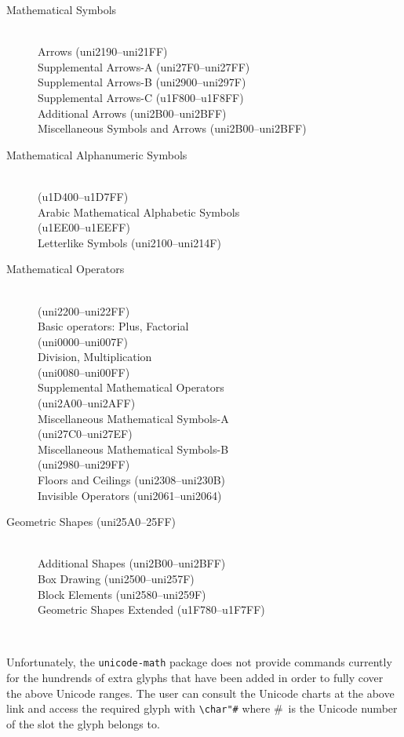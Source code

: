 \documentclass{article}
\begin{document}
\hspace*{-5em} \begin{description}
\item[Mathematical Symbols]
\ \\
Arrows (uni2190--uni21FF)\\
Supplemental Arrows-A (uni27F0--uni27FF)\\
Supplemental Arrows-B (uni2900--uni297F)\\
Supplemental Arrows-C (u1F800--u1F8FF)\\
Additional Arrows (uni2B00--uni2BFF)\\
Miscellaneous Symbols and Arrows (uni2B00--uni2BFF)
\item[Mathematical Alphanumeric Symbols] 
\ \\ (u1D400--u1D7FF)\\
     Arabic Mathematical Alphabetic Symbols\\ (u1EE00--u1EEFF)\\
     Letterlike Symbols (uni2100--uni214F)
\item[Mathematical Operators] 
\ \\ (uni2200--uni22FF)\\
    Basic operators: Plus, Factorial\\ (uni0000--uni007F)\\
             Division, Multiplication\\ (uni0080--uni00FF)\\
    Supplemental Mathematical Operators\\ (uni2A00--uni2AFF)\\
    Miscellaneous Mathematical Symbols-A\\ (uni27C0--uni27EF)\\
    Miscellaneous Mathematical Symbols-B\\ (uni2980--uni29FF)\\
    Floors and Ceilings (uni2308--uni230B)\\
    Invisible Operators (uni2061--uni2064)
  \item[Geometric Shapes (uni25A0--25FF)]
    \ \\
   Additional Shapes (uni2B00--uni2BFF)\\
   Box Drawing (uni2500--uni257F)\\
   Block Elements (uni2580--uni259F)\\
   Geometric Shapes Extended (u1F780--u1F7FF)
   \end{description}

\begin{figure}\vspace*{-1\baselineskip}
\ \\[2ex]
\end{figure}
  Unfortunately, the \texttt{unicode-math} package does not
provide commands currently for the hundrends of extra glyphs that have been added
in order to fully cover the above Unicode ranges. The user can 
consult the Unicode charts at the above link and access the required 
glyph with \verb|\char"#| where \#\ is the Unicode number of the
slot the glyph belongs to. 
\end{document}
